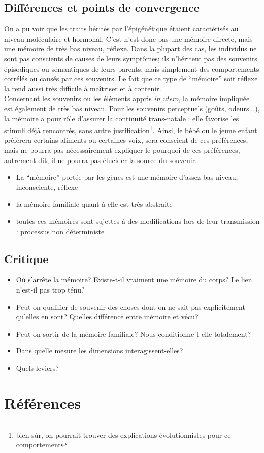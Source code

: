 \documentclass[french]{article}
\begin{document}
		\subsection{Différences et points de convergence}
			On a pu voir que les traits hérités par l'épigénétique étaient caractérisés au niveau moléculaire et hormonal. C'est n'est donc pas une mémoire directe, mais une mémoire de très bas niveau, réflexe. Dans la plupart des cas, les individus ne sont pas conscients de causes de leurs symptômes; ils n'héritent pas des souvenirs épisodiques ou sémantiques de leurs parents, mais simplement des comportements corrélés ou causés par ces souvenirs. Le fait que ce type de ``mémoire'' soit réflexe la rend aussi très difficile à maîtriser et à contenir. \\
			
			Concernant les souvenirs ou les éléments appris \textit{in utero}, la mémoire impliquée est également de très bas niveau. Pour les souvenirs perceptuels (goûts, odeurs...), la mémoire a pour rôle d'assurer la continuité trans-natale : elle favorise les stimuli déjà rencontrés, sans autre justification\footnote{bien sûr, on pourrait trouver des explications évolutionnistes pour ce comportement}. Ainsi, le bébé ou le jeune enfant préférera certains aliments ou certaines voix, sera conscient de ces préférences, mais ne pourra pas nécessairement expliquer le pourquoi de ces préférences, autrement dit, il ne pourra pas élucider la source du souvenir. \\
			
			
		\begin{itemize}
			\item La ``mémoire'' portée par les gènes est une mémoire d'assez bas niveau, inconsciente, réflexe
			\item la mémoire familiale quant à elle est très abstraite
			\item toutes ces mémoires sont sujettes à des modifications lors de leur transmission : processus non déterministe
		\end{itemize}
		\subsection{Critique}
		\begin{itemize}
			\item Où s'arrête la mémoire? Existe-t-il vraiment une mémoire du corps? Le lien n'est-il pas trop ténu?
			\item Peut-on qualifier de souvenir des choses dont on ne sait pas explicitement qu'elles en sont? Quelles différence entre mémoire et vécu?
			\item Peut-on sortir de la mémoire familiale? Nous conditionne-t-elle totalement?
			\item Dans quelle mesure les dimensions interagissent-elles?
			\item Quels leviers?
		\end{itemize}
	\newpage
	\section*{Références}
	\printbibliography[heading=main, keyword=main]
	\printbibliography[heading=minor, keyword=minor]
	\nocite{*}
\end{document}
